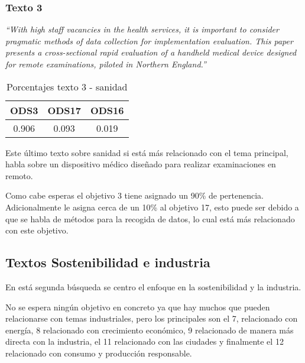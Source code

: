 \subsubsection{Texto 3}
\begin{center}
    \textit{``With high staff vacancies in the health services, it is important
    to consider pragmatic methods of data collection for implementation
    evaluation. This paper presents a cross-sectional rapid evaluation of a
    handheld medical device designed for remote examinations, piloted in
    Northern England.''}\cite{validationtexts3}
    \begin{table}[H]
            \begin{tabular}{c | c | c }
                \hline
                ODS3 & ODS17 & ODS16\\ \hline
                0.906 & 0.093 & 0.019\\ \hline
            \end{tabular}
            \caption{Porcentajes texto 3 - sanidad}
    \end{table}
\end{center}

Este último texto sobre sanidad si está más relacionado con el tema principal,
habla sobre un dispositivo médico diseñado para realizar examinaciones en
remoto.

Como cabe esperas el objetivo 3 tiene asignado un 90\% de pertenencia.
Adicionalmente le asigna cerca de un 10\% al objetivo 17, esto puede ser debido
a que se habla de métodos para la recogida de datos, lo cual está más
relacionado con este objetivo.

\subsection{Textos Sostenibilidad e industria}

En está segunda búsqueda se centro el enfoque en la sostenibilidad y la
industria.

No se espera ningún objetivo en concreto ya que hay muchos que pueden
relacionarse con temas industriales, pero los principales son el 7, relacionado
con energía, 8 relacionado con crecimiento económico, 9 relacionado de manera
más directa con la industria, el 11 relacionado con las ciudades y finalmente el
12 relacionado con consumo y producción responsable. 

